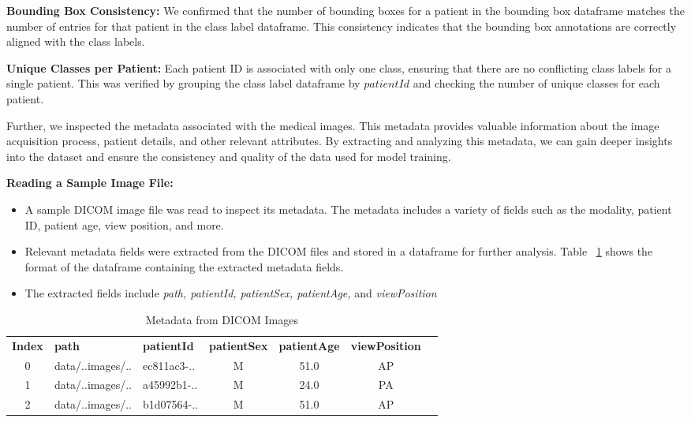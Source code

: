 \textbf{Bounding Box Consistency:} We confirmed that the number of bounding boxes for a patient in the bounding box dataframe matches the number of entries for that patient in the class label dataframe. This consistency indicates that the bounding box annotations are correctly aligned with the class labels.

\textbf{Unique Classes per Patient:} Each patient ID is associated with only one class, ensuring that there are no conflicting class labels for a single patient. This was verified by grouping the class label dataframe by $patientId$ and checking the number of unique classes for each patient.

Further, we inspected the metadata associated with the medical images. This metadata provides valuable information about the image acquisition process, patient details, and other relevant attributes. By extracting and analyzing this metadata, we can gain deeper insights into the dataset and ensure the consistency and quality of the data used for model training.

\textbf{Reading a Sample Image File:}
\begin{itemize}
    \item A sample DICOM image file was read to inspect its metadata. The metadata includes a variety of fields such as the modality, patient ID, patient age, view position, and more.
    \item Relevant metadata fields were extracted from the DICOM files and stored in a dataframe for further analysis. Table ~\ref{tab:cha-2 table4} shows the format of the dataframe containing the extracted metadata fields.
    \item The extracted fields include \emph{path, patientId, patientSex, patientAge,} and \emph{viewPosition}

\end{itemize}

\begin{table}[h!]
    \centering
    \caption{Metadata from DICOM Images}
    \label{tab:cha-2 table4}
    \begin{adjustbox}{max width=\textwidth}
        \begin{tabularx}{\textwidth}{c|X|X|c|c|c|c}
            \rowcolor{gray!20}
            \textbf{Index} & \textbf{path}    & \textbf{patientId} & \textbf{patientSex} & \textbf{patientAge} & \textbf{viewPosition} \\
            0              & data/..images/.. & ec811ac3-..        & M                   & 51.0                & AP                    \\
            1              & data/..images/.. & a45992b1-..        & M                   & 24.0                & PA                    \\
            2              & data/..images/.. & b1d07564-..        & M                   & 51.0                & AP                    \\
        \end{tabularx}
    \end{adjustbox}
\end{table}

